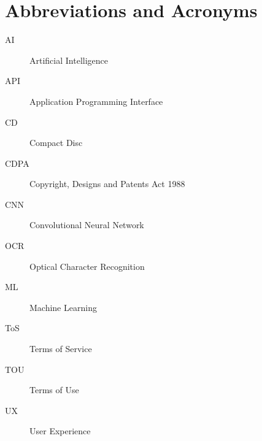     
    
    \makeatletter
    \title{\xmp@Title}
    \studentid{\xmp@Author}
    \makeatother
    
    \maketitle
    
    
    \uomtoc
    \uomlof
    \uomlot
    
    \section*{Abbreviations and Acronyms}
    
      \begin{description}
        \item[AI] Artificial Intelligence
        \item[API] Application Programming Interface
        \item[CD] Compact Disc
        \item[CDPA] Copyright, Designs and Patents Act 1988
        \item[CNN] Convolutional Neural Network
        \item[OCR] Optical Character Recognition
        \item[ML] Machine Learning
        \item[ToS] Terms of Service
        \item[TOU] Terms of Use
        \item[UX] User Experience
      \end{description}
    
